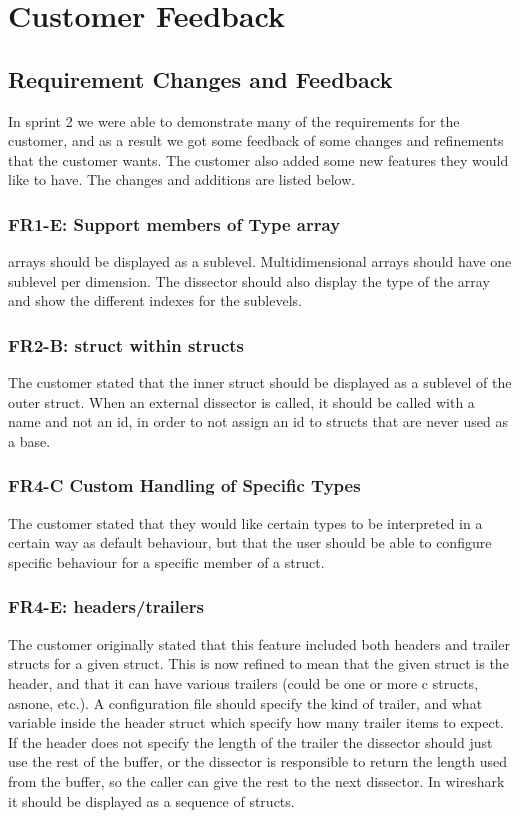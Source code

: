 \section{Customer Feedback}
\label{sec:sp2:feedback}
\subsection{Requirement Changes and Feedback}
In sprint 2 we were able to demonstrate many of the requirements for the customer, and as a result we got some feedback of some changes and refinements that the customer wants. The customer also added some new features they would like to have. The changes and additions are listed below.

\subsubsection{FR1-E: Support \Glspl{member} of Type \Gls{array}}
\Glspl{array} should be displayed as a sublevel. Multidimensional \glspl{array} should have one sublevel per dimension. The \gls{dissector} should also display the type of the \gls{array} and show the different indexes for the sublevels.

\subsubsection{FR2-B: \Gls{struct} within \Glspl{struct}}
The customer stated that the inner \gls{struct} should be displayed as a sublevel of the outer \gls{struct}.
When an external \gls{dissector} is called, it should be called with a name and not an id, in order to not assign an id to \glspl{struct} that are never used as a base.

\subsubsection{FR4-C Custom Handling of Specific Types}
The customer stated that they would like certain types to be interpreted in a certain way as default behaviour, but that the user should be able to configure specific behaviour for a specific \gls{member} of a \gls{struct}.

\subsubsection{FR4-E: \Glspl{header}/\Gls{trailers}}
The customer originally stated that this feature included both \glspl{header} and trailer \glspl{struct} for a given \gls{struct}. This is now refined to mean that the given \gls{struct} is the \gls{header}, and that it can have various \gls{trailers} (could be one or more \Gls{c} \glspl{struct}, \gls{asnone}, etc.). A configuration file should specify the kind of trailer, and what variable inside the \gls{header} \gls{struct} which specify how many trailer items to expect. If the \gls{header} does not specify the length of the trailer the \gls{dissector} should just use the rest of the buffer, or the \gls{dissector} is responsible to return the length used from the buffer, so the caller can give the rest to the next \gls{dissector}.
In \Gls{wireshark} it should be displayed as a sequence of \glspl{struct}.

